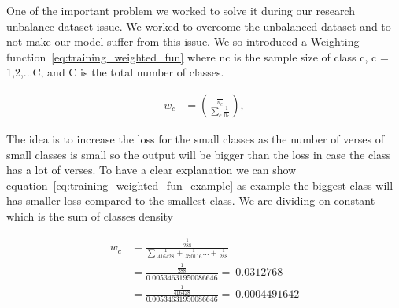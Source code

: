 One of the important problem we worked to solve it during our research unbalance dataset issue. We worked to overcome the unbalanced dataset and to not make our model suffer from this issue. We so introduced a Weighting function~\ref{eq:training_weighted_fun} where nc is the sample size of class c, c = 1,2,...C, and C
is the total number of classes.

\begin{align}
  w_c &= \left(\frac{\frac{1}{n_c}}{\sum_c \frac{1}{n_c}} \right),\label{eq:training_weighted_fun}
\end{align}

The idea is to increase the loss for the small classes as the number of verses of small classes is small so the output will be bigger than the loss in case the class has a lot of verses. To have a clear explanation we can show equation~\ref{eq:training_weighted_fun_example} as example the biggest class will has smaller loss compared to the smallest class. We are dividing on constant which is the sum of classes density

\begin{subequations}
\begin{align}
  w_c &=  \frac{\frac{1}{288}}{\sum\frac{1}{416428}+\frac{1}{370116}\dots+\frac{1}{288}}\\
      &= \frac{\frac{1}{288}}{0.00534631950086646} = ~0.0312768 \\
        &= \frac{\frac{1}{416428}}{0.00534631950086646} = ~0.0004491642
\end{align}\label{eq:training_weighted_fun_example}
\end{subequations}